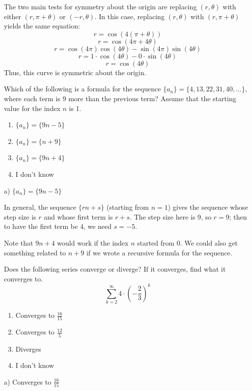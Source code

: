 \documentclass[addpoints,12pt,answers]{exam}
\begin{document}
\begin{questions}
\begin{solution}
    The two main tests for symmetry about the origin are replacing $(r,\theta)$ with either $(r,\pi+\theta)$ or $(-r,\theta)$. In this case, replacing $(r,\theta)$ with $(r,\pi+\theta)$ yields the same equation:
    $$r=\cos(4(\pi+\theta))$$
    $$r=\cos(4\pi+4\theta)$$
    $$r=\cos(4\pi)\cos(4\theta)-\sin(4\pi)\sin(4\theta)$$
    $$r=1\cdot\cos(4\theta)-0\cdot\sin(4\theta)$$
    $$r=\cos(4\theta)$$
    Thus, this curve is symmetric about the origin.
  \end{solution}
  \newpage
{}
  \question
  Which of the following is a formula for the sequence $\{a_n\}=\{4,13,22,31,40,\ldots\}$, where each term is 9 more than the previous term? Assume that the starting value for the index $n$ is 1.
  \begin{enumerate}[label=\alph*)]
    \item
    $\{a_n\}=\{9n-5\}$
    \item
    $\{a_n\}=\{n+9\}$
    \item
    $\{a_n\}=\{9n+4\}$
    \item
    I don't know
  \end{enumerate}
  \begin{solution}
    a) $\{a_n\}=\{9n-5\}$
    
    In general, the sequence $\{rn+s\}$ (starting from $n=1$) gives the sequence whose step size is $r$ and whose first term is $r+s$. The step size here is 9, so $r=9$; then to have the first term be 4, we need $s=-5$.
    
    Note that $9n+4$ would work if the index $n$ started from 0. We could also get something related to $n+9$ if we wrote a recursive formula for the sequence.
  \end{solution}
  \newpage
  \question
  Does the following series converge or diverge? If it converges, find what it converges to.
  $$\sum_{k=2}^\infty 4\cdot\left(-\frac{2}{3}\right)^{k}$$
  \begin{enumerate}[label=\alph*)]
    \item
    Converges to $\displaystyle\frac{16}{15}$
    \item
    Converges to $\displaystyle\frac{12}{5}$
    \item
    Diverges
    \item
    I don't know
  \end{enumerate}
  \begin{solution}
    a) Converges to $\displaystyle\frac{16}{15}$
    

\end{solution}
\end{questions}
\end{document}
